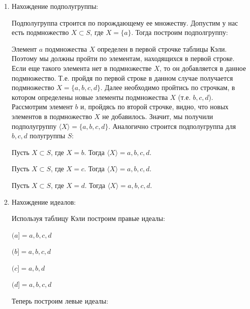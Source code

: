 \documentclass[bachelor, och, labwork]{shiza}
\begin{document}
    \begin{enumerate}
      \item Нахождение подполугруппы:
    
      Подполугруппа строится по порождающему ее множеству. Допустим у нас есть подмножество $X \subset S$, где $X = \{ a\}$. 
      Тогда построим подполгруппу:
  
      Элемент $a$ подмножества $X$ определен в первой строчке таблицы Кэли. Поэтому мы должны пройти по элементам, находящихся в первой
      строке. Если еще такого элемента нет в подмножестве $X$, то он добавляется в данное подмножество. Т.е. пройдя по первой строке в
      данном случае получается подмножество $X = \{a, b, c, d\}$. Далее необходимо пройтись по строчкам, в котором определены новые элементы
      подмножества $X$ (т.е. $b, c, d$). Рассмотрим элемент $b$ и, пройдясь по второй строчке, видно, что новых элементов в подмножество $X$
      не добавилось. Значит, мы получили подполугруппу $\langle X \rangle = \{a, b, c, d\}$.  
      Аналогично строится подполугруппа для $b,c,d$ полугруппы $S$:

      Пусть $X \subset S$, где $X = {b}$. Тогда $\langle X \rangle = {a, b, c, d}$.

      Пусть $X \subset S$, где $X = {c}$. Тогда $\langle X \rangle = {a, b, c, d}$.

      Пусть $X \subset S$, где $X = {d}$. Тогда $\langle X \rangle = {a, b, c, d}$.
      
      \item Нахождение идеалов:
      
      Используя таблицу Кэли построим правые идеалы:
      
      \begin{center}

        $(a] = {a, b, c, d}$

        $(b] = {a, b, c, d}$
  
        $(c] = {a, b, d}$
  
        $(d] = {a, b, c, d}$
    
      \end{center}
    
      
      Теперь построим левые идеалы:

      \begin{center}
      

\end{center}
\end{enumerate}
\end{document}
